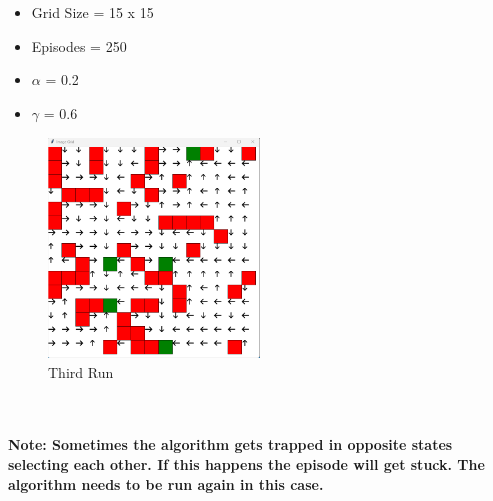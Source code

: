 \documentclass{article}
\begin{document}
\\~\\
\begin{itemize}
    \item Grid Size = 15 x 15
    \item Episodes = 250
    \item $\alpha$ = 0.2 
    \item $\gamma$ = 0.6
\end{itemize}

\begin{figure}[H]
  \centering
  \includegraphics[width=0.5\textwidth, height=0.3\textheight]{grid_3.png}
  \caption{Third Run}
\end{figure}

\\~\\
\textbf{Note: Sometimes the algorithm gets trapped in opposite states selecting each other. If this happens the episode will get stuck. The algorithm needs to be run again in this case.}
\end{document}
